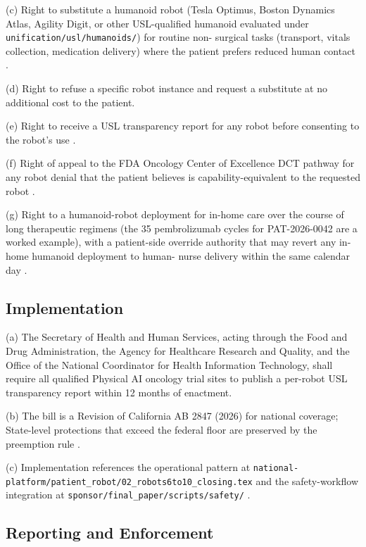 (c) Right to substitute a humanoid robot (Tesla Optimus, Boston
Dynamics Atlas, Agility Digit, or other USL-qualified humanoid
evaluated under \texttt{unification/usl/humanoids/}) for routine non-
surgical tasks (transport, vitals collection, medication delivery)
where the patient prefers reduced human contact
\cite{kawchak_2026_18778219}.

(d) Right to refuse a specific robot instance and request a
substitute at no additional cost to the patient.

(e) Right to receive a USL transparency report for any robot before
consenting to the robot's use \cite{kawchak_2026_18778219}.

(f) Right of appeal to the FDA Oncology Center of Excellence DCT
pathway for any robot denial that the patient believes is
capability-equivalent to the requested robot
\cite{fda_oce_advancing_oncology_dct_2024}.

(g) Right to a humanoid-robot deployment for in-home care over the
course of long therapeutic regimens (the 35 pembrolizumab cycles for
PAT-2026-0042 are a worked example), with a patient-side override
authority that may revert any in-home humanoid deployment to human-
nurse delivery within the same calendar day
\cite{kawchak_2026_19119939}.

\subsection{Implementation}

(a) The Secretary of Health and Human Services, acting through the
Food and Drug Administration, the Agency for Healthcare Research and
Quality, and the Office of the National Coordinator for Health
Information Technology, shall require all qualified Physical AI
oncology trial sites to publish a per-robot USL transparency report
within 12 months of enactment.

(b) The bill is a Revision of California AB 2847 (2026) for national
coverage; State-level protections that exceed the federal floor are
preserved by the preemption rule
\cite{kawchak_2026_19176370}.

(c) Implementation references the operational pattern at
\texttt{national-platform/patient\_robot/02\_robots6to10\_closing.tex}
and the safety-workflow integration at
\texttt{sponsor/final\_paper/scripts/safety/}
\cite{kawchak_2026_19244918, kawchak_2026_19396256}.

\subsection{Reporting and Enforcement}

